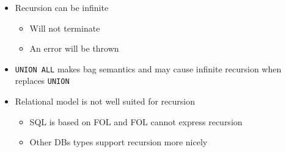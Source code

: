 \begin{itemize}
\begin{itemize}
\begin{itemize}
                \end{itemize}
        \end{itemize}
    \item Recursion can be infinite
        \begin{itemize}
            \item Will not terminate
            \item An error will be thrown
        \end{itemize}
    \item \verb+UNION ALL+ makes bag semantics and may cause infinite recursion when replaces \verb+UNION+
    \item Relational model is not well suited for recursion
        \begin{itemize}
            \item SQL is based on FOL and FOL cannot express recursion
            \item Other DBs types support recursion more nicely
        \end{itemize}
\end{itemize}
